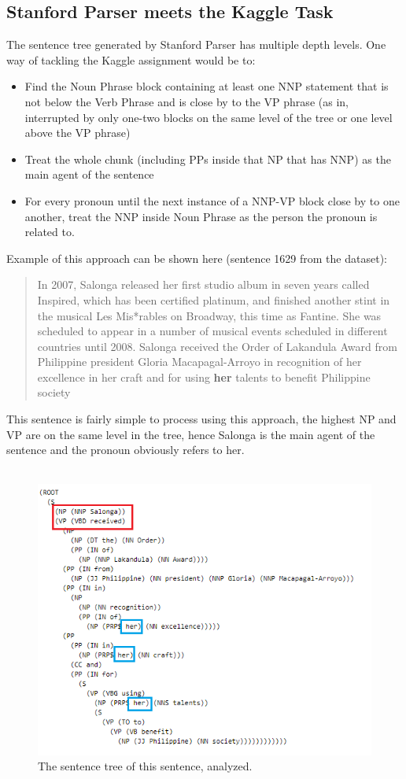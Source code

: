 \documentclass{article}
\begin{document}
\subsection{Stanford Parser meets the Kaggle Task}
The sentence tree generated by Stanford Parser has multiple depth levels. One way of tackling the Kaggle assignment would be to:
\begin{itemize}
    \item Find the Noun Phrase block containing at least one NNP statement that is not below the Verb Phrase and is close by to the VP phrase (as in, interrupted by only one-two blocks on the same level of the tree or one level above the VP phrase)
    \item Treat the whole chunk (including PPs inside that NP that has NNP) as the main agent of the sentence
    \item For every pronoun until the next instance of a NNP-VP block close by to one another, treat the NNP inside Noun Phrase as the person the pronoun is related to.
\end{itemize}
Example of this approach can be shown here (sentence 1629 from the dataset):
\begin{quote}
    In 2007, Salonga released her first studio album in seven years called Inspired, which has been certified platinum, and finished another stint in the musical Les Mis*rables on Broadway, this time as Fantine. She was scheduled to appear in a number of musical events scheduled in different countries until 2008. Salonga received the Order of Lakandula Award from Philippine president Gloria Macapagal-Arroyo in recognition of her excellence in her craft and for using \textbf{her} talents to benefit Philippine society
\end{quote}
This sentence is fairly simple to process using this approach, the highest NP and VP are on the same level in the tree, hence Salonga is the main agent of the sentence and the pronoun obviously refers to her. \\ \\
\begin{figure}[h!]
    \centering
\includegraphics[width=\textwidth]{Example1.png}
    \caption{The sentence tree of this sentence, analyzed.}
\end{figure}
\end{document}
